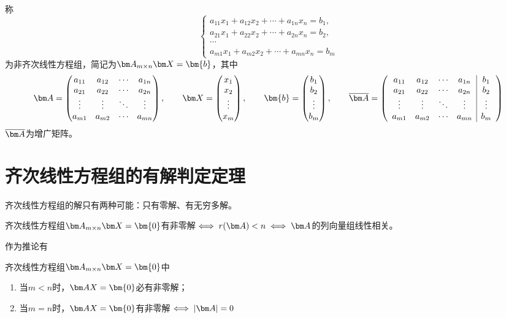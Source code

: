 称
\[
    \begin{cases}
        a_{11}x_1 + a_{12}x_2 + \cdots + a_{1n}x_n = b_1, \\
        a_{21}x_1 + a_{22}x_2 + \cdots + a_{2n}x_n = b_2, \\
        \cdots                                            \\
        a_{m1}x_1 + a_{m2}x_2 + \cdots + a_{mn}x_n = b_m
    \end{cases}
\]
为非齐次线性方程组，简记为$\mat{A}_{m\times n}\mat{X}=\bm{b}$，其中
\[
    \mat{A} =
    \begin{pmatrix}
        a_{11} & a_{12} & \cdots & a_{1n} \\
        a_{21} & a_{22} & \cdots & a_{2n} \\
        \vdots & \vdots & \ddots & \vdots \\
        a_{m1} & a_{m2} & \cdots & a_{mn}
    \end{pmatrix},
    \qquad
    \mat{X}=
    \begin{pmatrix}
        x_1 \\x_2\\\vdots\\x_m
    \end{pmatrix},
    \qquad
    \bm{b}=
    \begin{pmatrix}
        b_1 \\b_2\\\vdots\\b_m
    \end{pmatrix},
    \qquad
    \overline{\mat{A}}=
    \left(\begin{array}{cccc|c}
            a_{11} & a_{12} & \cdots & a_{1n} & b_1    \\
            a_{21} & a_{22} & \cdots & a_{2n} & b_2    \\
            \vdots & \vdots & \ddots & \vdots & \vdots \\
            a_{m1} & a_{m2} & \cdots & a_{mn} & b_m
        \end{array}\right)
\]
$\overline{\mat{A}}$为增广矩阵。

\section{齐次线性方程组的有解判定定理}
齐次线性方程组的解只有两种可能：只有零解、有无穷多解。
\begin{theorem}
    齐次线性方程组$\mat{A}_{m\times n}\mat{X}=\bm{0}$有非零解$\iff r(\mat{A})<n \iff \mat{A}$的列向量组线性相关。
\end{theorem}
作为推论有
\begin{theorem}
    齐次线性方程组$\mat{A}_{m\times n}\mat{X}=\bm{0}$中
    \begin{enumerate}[(1)]
        \item 当$m<n$时，$\mat{AX}=\bm{0}$必有非零解；
        \item 当$m=n$时，$\mat{AX}=\bm{0}$有非零解$\iff |\mat{A}|=0$
    \end{enumerate}
\end{theorem}

